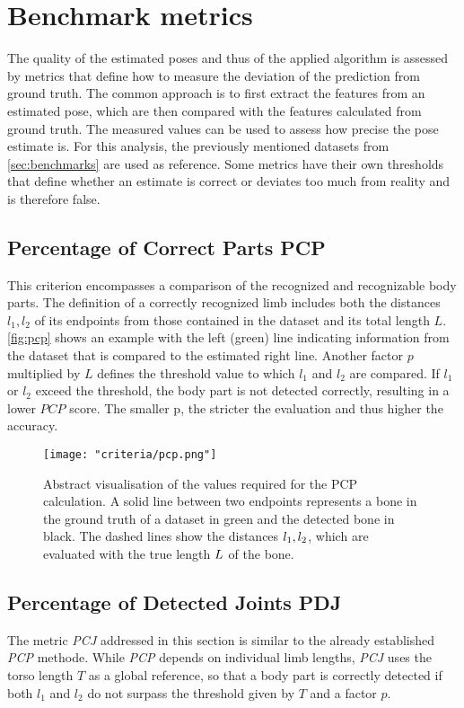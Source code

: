 \section{Benchmark metrics}
The quality of the estimated poses and thus of the applied algorithm is assessed by metrics that define how to measure the deviation of the prediction from ground truth. The common approach is to first extract the features from an estimated pose, which are then compared with the features calculated from ground truth. The measured values can be used to assess how precise the pose estimate is. For this analysis, the previously mentioned datasets from \autoref{sec:benchmarks} are used as reference. Some metrics have their own thresholds that define whether an estimate is correct or deviates too much from reality and is therefore false.

\subsection{Percentage of Correct Parts PCP}
\label{sec:pcp}
This criterion encompasses a comparison of the recognized and recognizable body parts. The definition of a correctly recognized limb includes both the distances $l_{1}, l_{2}$ of its endpoints from those contained in the dataset and its total length $L$. \autoref{fig:pcp} shows an example with the left (green) line indicating information from the dataset that is compared to the estimated right line. Another factor $p$ multiplied by $L$ defines the threshold value to which $l_{1}$ and $l_{2}$ are compared. If $l_{1}$ or $l_{2}$ exceed the threshold, the body part is not detected correctly, resulting in a lower $PCP$ score.
The smaller p, the stricter the evaluation and thus higher the accuracy.\cite{pcp}

\begin{figure}[h]
\centering
\texttt{[image: "criteria/pcp.png"]}
\caption{Abstract visualisation of the values required for the PCP calculation. A solid line between two endpoints represents a bone in the ground truth of a dataset in green and the detected bone in black. The dashed lines show the distances $\protect l_{1}, l_{2}$, which are evaluated with the true length $\protect L$ of the bone.}
\label{fig:pcp}
\end{figure}

\subsection{Percentage of Detected Joints PDJ}
\label{sec:pdj}
The metric \emph{PCJ} addressed in this section is similar to the already established \emph{PCP} methode. While \emph{PCP} depends on individual limb lengths, \emph{PCJ} uses the torso length $T$ as a global reference, so that a body part is correctly detected if both $l_{1}$ and $l_{2}$ do not surpass the threshold given by $T$ and a factor $p$. \cite{pdj}

